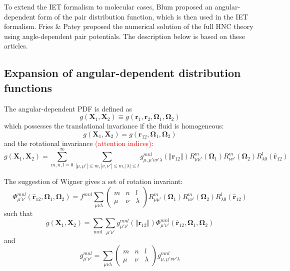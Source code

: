 To extend the \acs{IET} formalism to molecular cases, Blum \citep{Blum_I,Blum_II}
proposed an angular-dependent form of the pair distribution function,
which is then used in the \acs{IET} formalism. Fries \& Patey \citep{Fries_Patey_1985}
proposed the numerical solution of the full \acs{HNC} theory using
angle-dependent pair potentials. The description below is based on
these articles.

\subsection{Expansion of angular-dependent distribution functions}

The angular-dependent \acs{PDF} is defined as 
\begin{equation}
g(\mathbf{X}_{1},\mathbf{X}_{2})\equiv g(\mathbf{r}_{1},\mathbf{r}_{2},\mathbf{\Omega}_{1},\mathbf{\Omega}_{2})
\end{equation}
which possesses the translational invariance if the fluid is homogeneous:
\begin{equation}
g(\mathbf{X}_{1},\mathbf{X}_{2})=g(\mathbf{r}_{12},\mathbf{\Omega}_{1},\mathbf{\Omega}_{2})
\end{equation}
and the rotational invariance \textcolor{red}{(attention indices)}:
\begin{equation}
g(\mathbf{X}_{1},\mathbf{X}_{2})=\sum_{m,n,l=0}^{\infty}\sum_{\left|\mu,\mu'\right|\leq m,\left|\nu,\nu'\right|\leq m,\left|\lambda\right|\leq l}g_{\mu,\mu'\nu\nu'\lambda}^{mnl}(\left\Vert \mathbf{r}_{12}\right\Vert )R_{\mu\mu'}^{m}(\mathbf{\Omega}_{1})R_{\nu\nu'}^{m}(\mathbf{\Omega}_{2})R_{\lambda0}^{l}(\hat{\mathbf{r}}_{12})
\end{equation}

The suggestion of Wigner gives a set of rotation invariant:
\begin{equation}
\Phi_{\mu'\nu'}^{mnl}(\hat{\mathbf{r}}_{12},\mathbf{\Omega}_{1},\mathbf{\Omega}_{2})=f^{mnl}\sum_{\mu\nu\lambda}\left(\begin{array}{ccc}
m & n & l\\
\mu & \nu & \lambda
\end{array}\right)R_{\mu\mu'}^{m}(\mathbf{\Omega}_{1})R_{\nu\nu'}^{m}(\mathbf{\Omega}_{2})R_{\lambda0}^{l}(\hat{\mathbf{r}}_{12})
\end{equation}
such that
\begin{equation}
g(\mathbf{X}_{1},\mathbf{X}_{2})=\sum_{mnl}\sum_{\mu'\nu'}g_{\mu'\nu'}^{mnl}(\left\Vert \mathbf{r}_{12}\right\Vert )\Phi_{\mu'\nu'}^{mnl}(\hat{\mathbf{r}}_{12},\mathbf{\Omega}_{1},\mathbf{\Omega}_{2})
\end{equation}
and
\begin{equation}
g_{\mu'\nu'}^{mnl}=\sum_{\mu\nu\lambda}\left(\begin{array}{ccc}
m & n & l\\
\mu & \nu & \lambda
\end{array}\right)g_{\mu,\mu'\nu\nu'\lambda}^{mnl}
\end{equation}


